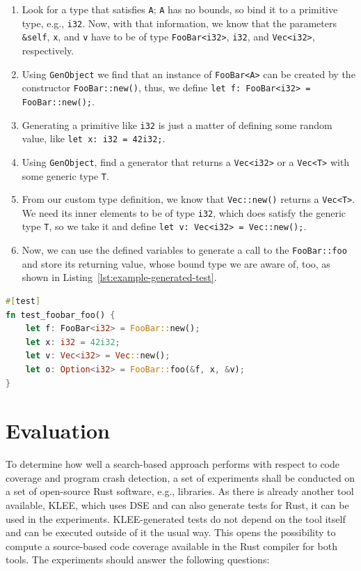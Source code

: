 \documentclass{article}
\begin{document}
\begin{enumerate} 
    \item Look for a type that satisfies \lstinline{A}; \lstinline{A} has no bounds, so bind it to a primitive type, e.g., \lstinline{i32}. Now, with that information, we know that the parameters \lstinline{&self}, \lstinline{x}, and \lstinline{v} have to be of type \lstinline{FooBar<i32>}, \lstinline{i32}, and \lstinline{Vec<i32>}, respectively.
    \item Using \lstinline{GenObject} we find that an instance of \lstinline{FooBar<A>} can be created by the constructor \lstinline{FooBar::new()}, thus, we define \lstinline{let f: FooBar<i32> = FooBar::new();}.
    \item Generating a primitive like \lstinline{i32} is just a matter of defining some random value, like \lstinline{let x: i32 = 42i32;}. 
    \item Using \lstinline{GenObject}, find a generator that returns a \lstinline{Vec<i32>} or a \lstinline{Vec<T>} with some generic type \lstinline{T}.
    \item From our custom type definition, we know that \lstinline{Vec::new()} returns a \lstinline{Vec<T>}. We need its inner elements to be of type \lstinline{i32}, which does satisfy the generic type \lstinline{T}, so we take it and define \lstinline{let v: Vec<i32> = Vec::new();}.
    \item Now, we can use the defined variables to generate a call to the \lstinline{FooBar::foo} and store its returning value, whose bound type we are aware of, too, as shown in Listing~\ref{lst:example-generated-test}.
\end{enumerate}

\begin{lstlisting}[language=Rust, style=boxed, caption={An example test that invokes \lstinline{FooBar::foo}}, label=lst:example-generated-test]
#[test]
fn test_foobar_foo() {
    let f: FooBar<i32> = FooBar::new();
    let x: i32 = 42i32;
    let v: Vec<i32> = Vec::new();
    let o: Option<i32> = FooBar::foo(&f, x, &v);
}
\end{lstlisting}

\section{Evaluation}
To determine how well a search-based approach performs with respect to code coverage and program crash detection, a set of experiments shall be conducted on a set of open-source Rust software, e.g., libraries. As there is already another tool available, KLEE, which uses \ac{DSE} and can also generate tests for Rust, it can be used in the experiments. KLEE-generated tests do not depend on the tool itself and can be executed outside of it the usual way. This opens the possibility to compute a source-based code coverage available in the Rust compiler for both tools. The experiments should answer the following questions: 
\end{document}
